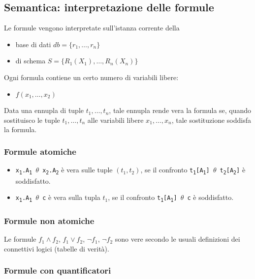 \documentclass{report}
\begin{document}
\subsection{Semantica: interpretazione delle formule}

Le formule vengono interpretate sull'istanza corrente della
\begin{itemize}
\item base di dati $db = \{r_1, \dots, r_n\}$ 
\item di schema $S = \{R_1(X_1), \dots, R_n(X_n)\}$
\end{itemize}
Ogni formula contiene un certo numero di variabili libere:
\begin{itemize}
\item $f(x_1, \dots, x_2)$
\end{itemize}

Data una ennupla di tuple $t_1, \dots, t_n$, tale ennupla rende vera la formula se, quando sostituisco le tuple $t_1, \dots, t_n$ alle variabili libere $x_1, \dots, x_n$, tale sostituzione soddisfa la formula.

\subsubsection{Formule atomiche}
\begin{itemize}
\item \texttt{x\textsubscript{1}.A\textsubscript{1} $\theta$ x\textsubscript{2}.A\textsubscript{2}} \`e vera sulle tuple $(t_1, t_2)$, se il confronto \texttt{t\textsubscript{1}[A\textsubscript{1}] $\theta$ t\textsubscript{2}[A\textsubscript{2}]} \`e soddisfatto.
\item \texttt{x\textsubscript{1}.A\textsubscript{1} $\theta$ c} \`e vera sulla tupla $t_1$, se il confronto \texttt{t\textsubscript{1}[A\textsubscript{1}] $\theta$ c} \`e soddisfatto.
\end{itemize}

\subsubsection{Formule non atomiche}

Le formule $f_1 \wedge f_2$, $f_1 \vee f_2$, $\neg f_1$, $\neg f_2$ sono vere secondo le usuali definizioni dei connettivi logici (tabelle di verit\`a).

\subsubsection{Formule con quantificatori}
\end{document}
